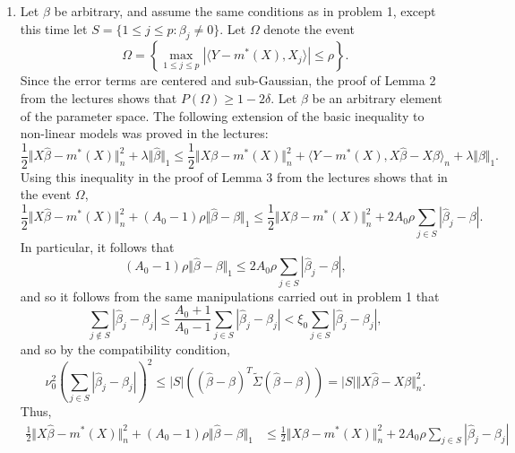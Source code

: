 \documentclass[12pt]{article}
\begin{document}
\begin{enumerate}
\item
Let $\beta$ be arbitrary, and assume the same conditions as in problem 1, except this time let $S = \{1 \leq j \leq p : \beta_j \neq 0\}$. Let $\Omega$ denote the event
\begin{equation*}
\Omega = \left\{\max_{1 \leq j \leq p} |\langle Y - m^*(X), X_j \rangle| \leq \rho \right\}.
\end{equation*}
Since the error terms are centered and sub-Gaussian, the proof of Lemma 2 from the lectures shows that $P(\Omega) \geq 1 - 2\delta$. Let $\beta$ be an arbitrary element of the parameter space. The following extension of the basic inequality to non-linear models was proved in the lectures:
\begin{equation*}
\frac{1}{2}\Vert X\hat{\beta} - m^*(X) \Vert_n^2 + \lambda \Vert \hat{\beta} \Vert_1 \leq \frac{1}{2}\Vert X\beta - m^*(X) \Vert_n^2 + \langle Y - m^*(X), X\hat{\beta} - X\beta \rangle_n + \lambda \Vert \beta \Vert_1.
\end{equation*}
Using this inequality in the proof of Lemma 3 from the lectures shows that in the event $\Omega$,
\begin{equation*}
\frac{1}{2}\Vert X\hat{\beta} - m^*(X) \Vert_n^2 + (A_0 - 1)\rho \Vert \hat{\beta} - \beta \Vert_1 \leq \frac{1}{2}\Vert X\beta - m^*(X) \Vert_n^2 + 2A_0\rho \sum_{j \in S} |\hat{\beta}_j - \beta|.
\end{equation*}
In particular, it follows that
\begin{equation*}
(A_0 - 1)\rho \Vert \hat{\beta} - \beta \Vert_1 \leq 2A_0\rho \sum_{j \in S} |\hat{\beta}_j - \beta|,
\end{equation*}
and so it follows from the same manipulations carried out in problem 1 that
\begin{equation*}
\sum_{j \not \in S} |\hat{\beta}_j - \beta_j| \leq \frac{A_0 +1}{A_0 - 1} \sum_{j \in S} |\hat{\beta}_j - \beta_j| < \xi_0 \sum_{j \in S} |\hat{\beta}_j - \beta_j|,
\end{equation*}
and so by the compatibility condition,
\begin{equation*}
\nu_0^2\left(\sum_{j \in S} |\hat{\beta}_j - \beta_j|\right)^2 \leq |S| \left((\hat{\beta} - \beta)^T\widetilde{\Sigma}(\hat{\beta} - \beta)\right) = |S| \Vert X\hat{\beta} - X\beta\Vert_n^2.
\end{equation*}
Thus,
\begin{align*}
\frac{1}{2}\Vert X\hat{\beta} - m^*(X) \Vert_n^2 + (A_0 - 1)\rho \Vert \hat{\beta} - \beta \Vert_1 &\leq \frac{1}{2}\Vert X\beta - m^*(X) \Vert_n^2 + 2A_0 \rho \sum_{j \in S} |\hat{\beta}_j - \beta_j| \\

\end{align*}
\end{enumerate}
\end{document}
